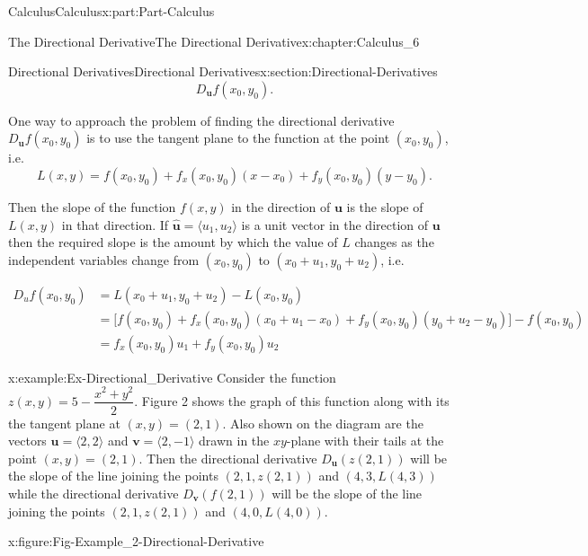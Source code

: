 \documentclass[oneside,10pt,]{book}
\numberwithin{equation}{section}
\newcommand{\bm}[1]{\boldsymbol{#1}}
\newcommand{\amp}{&}
\begin{document}
\begin{partptx}{Calculus}{}{Calculus}{}{}{x:part:Part-Calculus}
\begin{chapterptx}{The Directional Derivative}{}{The Directional Derivative}{}{}{x:chapter:Calculus_6}
\begin{sectionptx}{Directional Derivatives}{}{Directional Derivatives}{}{}{x:section:Directional-Derivatives}
\begin{equation*}
D_{\bm{u}}f(x_0,y_0)\text{.}
\end{equation*}
%
\par
One way to approach the problem of finding the directional derivative \(D_{\bm{u}}f(x_0,y_0)\) is to use the tangent plane to the function at the point \((x_0,y_0)\), i.e.%
\begin{equation*}
L(x,y) = f(x_0,y_0) + f_x (x_0,y_0)(x - x_0) + f_y(x_0,y_0) (y-y_0)\text{.}
\end{equation*}
%
\par
Then the slope of the function \(f(x,y)\) in the direction of \(\bm{u}\) is the slope of \(L(x,y)\) in that direction. If \(\hat{\bm{u}} = \langle u_1, u_2 \rangle\) is a unit vector in the direction of \(\bm{u}\) then the required slope is the amount by which the value of \(L\) changes as the independent variables change from \((x_0,y_0)\) to \((x_0+u_1,y_0+u_2)\), i.e.%
\par
%
\begin{align*}
D_u f(x_0,y_0) \amp = L(x_0+u_1, y_0+u_2) - L(x_0,y_0)\\
\amp = \bigg[ f(x_0,y_0) + f_x(x_0,y_0)(x_0+u_1 - x_0) + f_y(x_0,y_0)(y_0+u_2-y_0) \bigg] - f(x_0,y_0)\\
\amp = f_x(x_0,y_0)u_1 + f_y(x_0,y_0)u_2
\end{align*}
%
\begin{example}{}{x:example:Ex-Directional_Derivative}%
Consider the function \(z(x,y) = 5 - \dfrac{x^2+y^2}{2}\). Figure 2 shows the graph of this function along with its the tangent plane at \((x,y) = (2,1)\). Also shown on the diagram are the vectors \(\bm{u} = \langle 2,2 \rangle\) and \(\bm{v} = \langle 2,-1 \rangle\) drawn in the \(xy\)-plane with their tails at the point \((x,y) = (2,1)\). Then the directional derivative \(D_{\bm{u}}(z(2,1))\) will be the slope of the line joining the points \((2,1,z(2,1))\) and \((4,3,L(4,3))\) while the directional derivative \(D_{\bm{v}}(f(2,1))\) will be the slope of the line joining the points \((2,1,z(2,1))\) and \((4,0,L(4,0))\).%
\begin{figureptx}{}{x:figure:Fig-Example_2-Directional-Derivative}{}%
\begin{image}{0.15}{0.7}{0.15}%

\end{image}
\end{figureptx}
\end{example}
\end{sectionptx}
\end{chapterptx}
\end{partptx}
\end{document}
